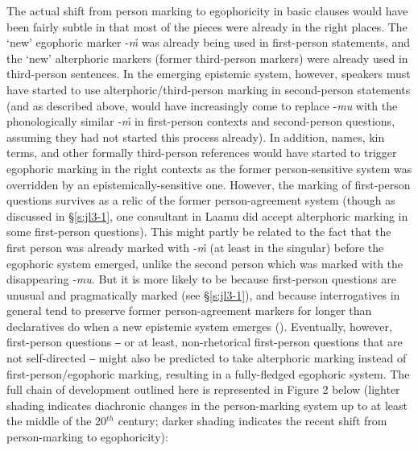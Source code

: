 \documentclass[output=paper]{langsci/langscibook}
\begin{document}
The actual shift from person marking to egophoricity in basic clauses would have been fairly subtle in that most of the pieces were already in the right places. The ‘new’ egophoric marker ‑\textit{m̊} was already being used in first-person statements, and the ‘new’ alterphoric markers (former third-person markers) were already used in third-person sentences. In the emerging epistemic system, however, speakers must have started to use alterphoric/third-person marking in second-person statements (and as described above, would have increasingly come to replace ‑\textit{mu} with the phonologically similar ‑\textit{m̊} in first-person contexts and second-person questions, assuming they had not started this process already). In addition, names, kin terms, and other formally third-person references would have started to trigger egophoric marking in the right contexts as the former person-sensitive system was overridden by an epistemically-sensitive one. However, the marking of first-person questions survives as a relic of the former person-agreement system (though as discussed in §\ref{s:jl3-1}, one consultant in Laamu did accept alterphoric marking in some first-person questions). This might partly be related to the fact that the first person was already marked with ‑\textit{m̊} (at least in the singular) before the egophoric system emerged, unlike the second person which was marked with the disappearing ‑\textit{mu}. But it is more likely to be because first-person questions are unusual and pragmatically marked (see §\ref{s:jl3-1}), and because interrogatives in general tend to preserve former person-agreement markers for longer than declaratives do when a new epistemic system emerges (\citealt{WidmerZemp2017}). Eventually, however, first-person questions ‒ or at least, non-rhetorical first-person questions that are not self-directed ‒ might also be predicted to take alterphoric marking instead of first-person/egophoric marking, resulting in a fully-fledged egophoric system. The full chain of development outlined here is represented in Figure 2 %
below (lighter shading indicates diachronic changes in the person-marking system up to at least the middle of the 20$^{th}$ century; darker shading indicates the recent shift from person-marking to egophoricity):

\end{document}
